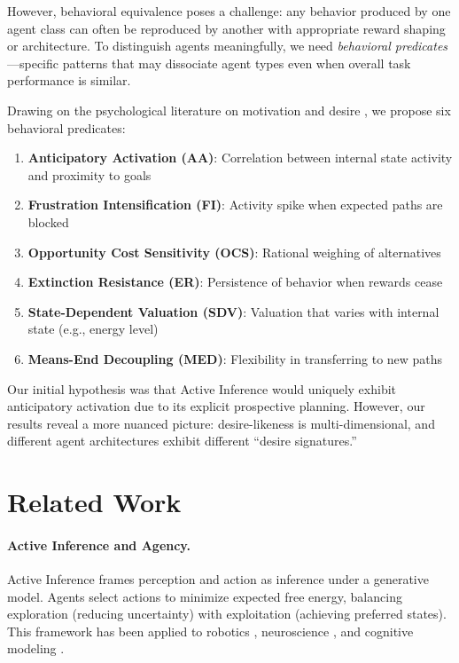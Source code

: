 \documentclass{article}
\begin{document}
However, behavioral equivalence poses a challenge: any behavior produced by one agent class can often be reproduced by another with appropriate reward shaping or architecture. To distinguish agents meaningfully, we need \textit{behavioral predicates}---specific patterns that may dissociate agent types even when overall task performance is similar.

Drawing on the psychological literature on motivation and desire \cite{berridge2009dissecting}, we propose six behavioral predicates:
\begin{enumerate}
    \item \textbf{Anticipatory Activation (AA)}: Correlation between internal state activity and proximity to goals
    \item \textbf{Frustration Intensification (FI)}: Activity spike when expected paths are blocked
    \item \textbf{Opportunity Cost Sensitivity (OCS)}: Rational weighing of alternatives
    \item \textbf{Extinction Resistance (ER)}: Persistence of behavior when rewards cease
    \item \textbf{State-Dependent Valuation (SDV)}: Valuation that varies with internal state (e.g., energy level)
    \item \textbf{Means-End Decoupling (MED)}: Flexibility in transferring to new paths
\end{enumerate}

Our initial hypothesis was that Active Inference would uniquely exhibit anticipatory activation due to its explicit prospective planning. However, our results reveal a more nuanced picture: desire-likeness is multi-dimensional, and different agent architectures exhibit different ``desire signatures.''

\section{Related Work}

\paragraph{Active Inference and Agency.} Active Inference \cite{friston2010free} frames perception and action as inference under a generative model. Agents select actions to minimize expected free energy, balancing exploration (reducing uncertainty) with exploitation (achieving preferred states). This framework has been applied to robotics \cite{lanillos2021active}, neuroscience \cite{parr2022active}, and cognitive modeling \cite{smith2022step}.
\end{document}
